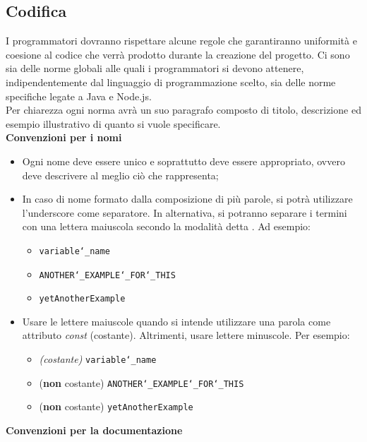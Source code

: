 \subsection{Codifica}
\label{sec:codifica}
I programmatori dovranno rispettare alcune regole che garantiranno uniformità e coesione al codice che verrà prodotto durante la creazione del progetto. Ci sono sia delle norme globali alle quali i programmatori si devono attenere, indipendentemente dal linguaggio di programmazione scelto, sia delle norme specifiche legate a Java e Node.js.\\[0.5cm]
Per chiarezza ogni norma avrà un suo paragrafo composto di titolo, descrizione ed esempio illustrativo di quanto si vuole specificare.\\[0.5cm]
\textbf{Convenzioni per i nomi}
\begin{itemize}
	\item Ogni nome deve essere unico e soprattutto deve essere appropriato, ovvero deve descrivere al meglio ciò che rappresenta;
	\item In caso di nome formato dalla composizione di più parole, si potrà utilizzare l’underscore come separatore. In alternativa, si potranno separare i termini con una lettera maiuscola secondo la modalità detta . Ad esempio:
	\begin{itemize}
		\item \texttt{variable\char`_name}
		\item \texttt{ANOTHER\char`_EXAMPLE\char`_FOR\char`_THIS}
		\item \texttt{yetAnotherExample}
	\end{itemize}
	\item Usare le lettere maiuscole quando si intende utilizzare una parola come attributo \emph{const} (costante). Altrimenti, usare lettere minuscole. Per esempio:
	\begin{itemize}
		\item \emph{(costante)} \texttt{variable\char`_name}
		\item (\textbf{non} costante) \texttt{ANOTHER\char`_EXAMPLE\char`_FOR\char`_THIS}
		\item (\textbf{non} costante) \texttt{yetAnotherExample}
	\end{itemize}
\end{itemize}
\textbf{Convenzioni per la documentazione}
